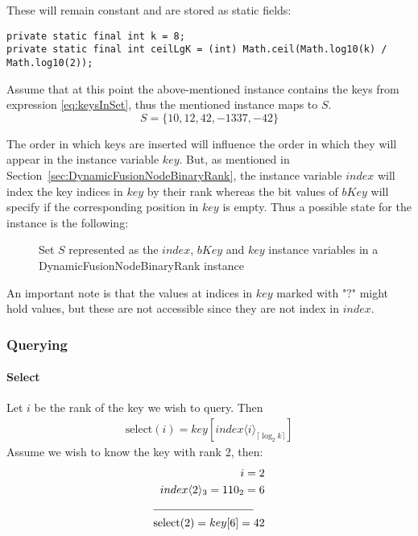 These will remain constant and are stored as static fields:
\begin{lstlisting}
private static final int k = 8;
private static final int ceilLgK = (int) Math.ceil(Math.log10(k) / Math.log10(2));
\end{lstlisting}

Assume that at this point the above-mentioned instance contains the keys from expression \ref{eq:keysInSet}, thus the mentioned instance maps to $S$.
\begin{equation} \label{eq:keysInSet}
    S = \{10, 12, 42, -1337, -42 \}
\end{equation}

The order in which keys are inserted will influence the order in which they will appear in the instance variable $key$. But, as mentioned in Section~\ref{sec:DynamicFusionNodeBinaryRank}, the instance variable $index$ will index the key indices in $key$ by their rank whereas the bit values of $bKey$ will specify if the corresponding position in $key$ is empty. Thus a possible state for the instance is the following:

\begin{figure}[H]
\centering

\caption[Set $S$ represented by the state of the instance variables]{Set $S$ represented as the $index$, $bKey$ and $key$ instance variables in a {\ttfamily DynamicFusionNodeBinaryRank} instance}
\label{fig:stateOfTheInstance}
\end{figure}

An important note is that the values at indices in $key$ marked with "$?$" might hold values, but these are not accessible since they are not index in $index$.

\subsubsection{Querying}

\paragraph{Select}
Let $i$ be the rank of the key we wish to query. Then
\begin{align*}
\text{select}(i) = key[ index\langle i\rangle_{\lceil \log_2 k \rceil}]
\end{align*}
Assume we wish to know the key with rank 2, then:
\begin{align*}
    i = 2 \\
    index\langle 2\rangle_3 = 110_2 = 6 \\
    \cline{1-2}
    \text{select}(2) = key[6] = 42
\end{align*}

